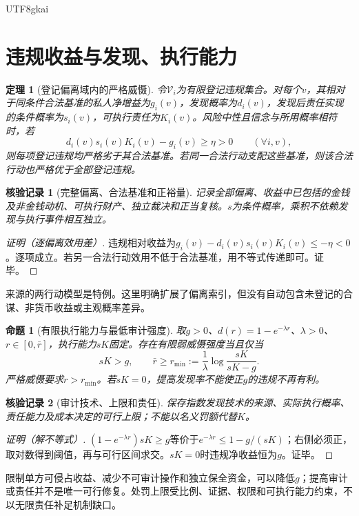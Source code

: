 \documentclass[12pt,a4paper,openany]{report}
\newtheorem{theorem}{定理}[chapter]
\newtheorem{proposition}{命题}[chapter]
\newtheorem{Certificate}{核验记录}[chapter]
\begin{document}
\begin{CJK*}{UTF8}{gkai}
\section{违规收益与发现、执行能力}
\begin{theorem}[登记偏离域内的严格威慑]
\label{thm:deterrence}
令$\mathcal V_i$为有限登记违规集合。对每个$v$，其相对于同条件合法基准的私人净增益为$g_i(v)$，发现概率为$d_i(v)$，发现后责任实现的条件概率为$s_i(v)$，可执行责任为$K_i(v)$。风险中性且信念与所用概率相符时，若
\[
 d_i(v)s_i(v)K_i(v)-g_i(v)\ge\eta>0
 \qquad(\forall i,v),
\]
则每项登记违规均严格劣于其合法基准。若同一合法行动支配这些基准，则该合法行动也严格优于全部登记违规。
\end{theorem}
\begin{Certificate}[完整偏离、合法基准和正裕量]
记录全部偏离、收益中已包括的金钱及非金钱动机、可执行财产、独立裁决和正当复核。$s$为条件概率，乘积不依赖发现与执行事件相互独立。
\end{Certificate}
\begin{proof}[证明（逐偏离效用差）]
违规相对收益为$g_i(v)-d_i(v)s_i(v)K_i(v)\le-\eta<0$。逐项成立。若另一合法行动效用不低于合法基准，用不等式传递即可。证毕。
\end{proof}
来源\cite[“发现与执行联合决定威慑”]{SourceSupplement}的两行动模型是特例。这里明确扩展了偏离索引，但没有自动包含未登记的合谋、非货币收益或主观概率差异。

\begin{proposition}[有限执行能力与最低审计强度]
\label{prop:audit-min}
取$g>0$、$d(r)=1-e^{-\lambda r}$、$\lambda>0$、$r\in[0,\bar r]$，执行能力$sK$固定。存在有限弱威慑强度当且仅当
\[
 sK>g,\qquad
 \bar r\ge r_{\min}:=\frac1\lambda\log\frac{sK}{sK-g}.
\]
严格威慑要求$r>r_{\min}$。若$sK=0$，提高发现率不能使正$g$的违规不再有利。
\end{proposition}
\begin{Certificate}[审计技术、上限和责任]
保存指数发现技术的来源、实际执行概率、责任能力及成本决定的可行上限；不能以名义罚额代替$K$。
\end{Certificate}
\begin{proof}[证明（解不等式）]
$(1-e^{-\lambda r})sK\ge g$等价于$e^{-\lambda r}\le1-g/(sK)$；右侧必须正，取对数得到阈值，再与可行区间求交。$sK=0$时违规净收益恒为$g$。证毕。
\end{proof}
限制单方可侵占收益、减少不可审计操作和独立保全资金，可以降低$g$；提高审计或责任并不是唯一可行修复。处罚上限受比例、证据、权限和可执行能力约束，不以无限责任补足机制缺口。


\end{CJK*}
\end{document}

